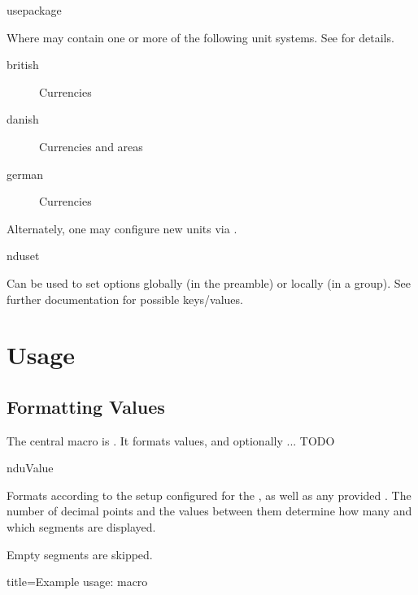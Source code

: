 \documentclass{article}
\begin{document}
\begin{docCommand}
	{usepackage}
	{}

Where  may contain one or more of the following unit systems. See  for details.

\begin{description}
\item[british] Currencies
\item[danish] Currencies and areas
\item[german] Currencies
\end{description}

Alternately, one may configure new units via .

\end{docCommand}

\begin{docCommand}
	{nduset}
	{}

	Can be used to set options globally (in the preamble) or locally (in a group). See further documentation for possible keys/values.

\end{docCommand}

\clearpage
\section{Usage} %

\subsection{Formatting Values} %

The central macro is . It formats values, and optionally ... TODO

\begin{docCommand}
	{nduValue}
	{}

Formats  according to the setup configured for the , as well as any provided . The number of decimal points and the values between them determine how many and which segments are displayed.

Empty segments are skipped.
	
\begin{dispExample*}{
	title=Example usage:  macro
}
\\
\\
\\
\\
\end{dispExample*}
\end{docCommand}
\end{document}
